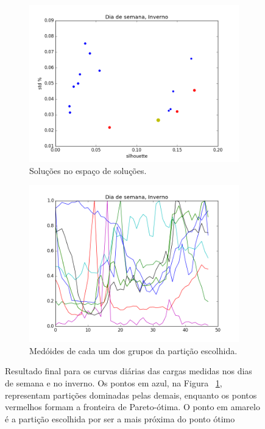 \begin{figure}
	\centering
	\begin{subfigure}{.5\textwidth}
		\centering
		\includegraphics[width=.9\linewidth]{figuras/australia_5000/pareto_Dia_de_semana_Inverno.png}
		\caption{Soluções no espaço de soluções.}
		\label{fig:pareto_DDS_inverno}
	\end{subfigure}%
	\begin{subfigure}{.5\textwidth}
		\centering
		\includegraphics[width=.9\linewidth]{figuras/australia_5000/Dia_de_semana_Inverno.png}
		\caption{Medóides de cada um dos grupos da partição escolhida.}
		\label{fig:DDS_inverno}
	\end{subfigure}
	\caption{Resultado final para os curvas diárias das cargas medidas nos dias de semana e no inverno. Os pontos em azul, na Figura ~\ref{fig:pareto_DDS_inverno}, representam partições dominadas pelas demais, enquanto os pontos vermelhos formam a fronteira de Pareto-ótima. O ponto em amarelo é a partição escolhida por ser a mais próxima do ponto ótimo}
	\label{fig:DDS_inverno_}
\end{figure}

